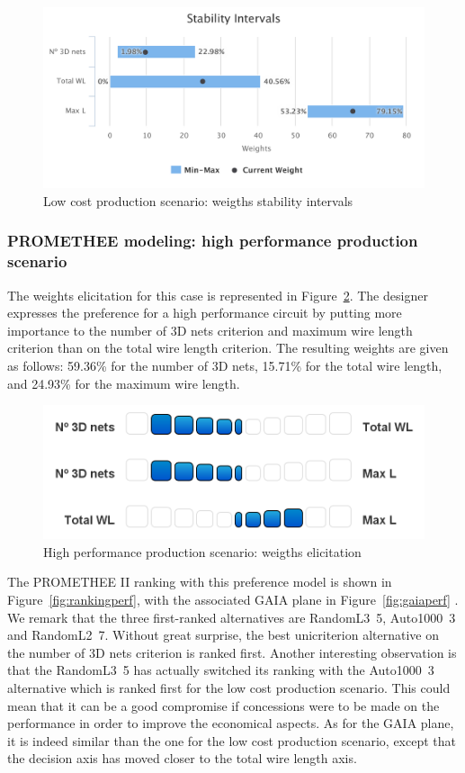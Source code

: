 \documentclass{svmult}
\begin{document}
\begin{figure}[h!]
    \centering
    \includegraphics[width=\linewidth]{stabilitycost}
    \caption{Low cost production scenario: weigths stability intervals}
    \label{fig:stabilitycost}
\end{figure}

\subsubsection{PROMETHEE modeling: high performance production scenario}
The weights elicitation for this case is represented in Figure~\ref{fig:elicitperf}. The designer expresses the preference for a high performance circuit by putting more importance to the number of 3D nets criterion and maximum wire length criterion than on the total wire length criterion. The resulting weights are given as follows: 59.36\% for the number of 3D nets, 15.71\% for the total wire length, and 24.93\% for the maximum wire length.

\begin{figure}[h!]
    \centering
    \includegraphics[width=0.62\linewidth]{elicitperf.png}
    \caption{High performance production scenario: weigths elicitation}
    \label{fig:elicitperf}
\end{figure}

The PROMETHEE II ranking with this preference model is shown in Figure~\ref{fig:rankingperf}, with the associated GAIA plane in Figure~\ref{fig:gaiaperf} . We remark that the three first-ranked alternatives are RandomL3~5, Auto1000~3 and RandomL2~7. Without great surprise, the best unicriterion alternative on the number of 3D nets criterion is ranked first. Another interesting observation is that the RandomL3~5 has actually switched its ranking with the Auto1000~3 alternative which is ranked first for the low cost production scenario. This could mean that it can be a good compromise if concessions were to be made on the performance in order to improve the economical aspects. As for the GAIA plane, it is indeed similar than the one for the low cost production scenario, except that the decision axis has moved closer to the total wire length axis.
\end{document}

